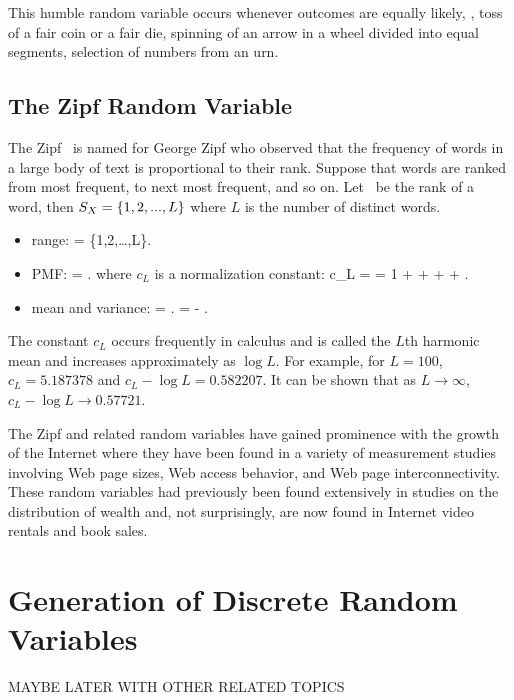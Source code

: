 	\item
	This humble random variable occurs
	whenever outcomes are equally likely, \eg,
	toss of a fair coin or a fair die,
	spinning of an arrow in a wheel divided into equal segments,
	selection of numbers from an urn.
\eit

\subsection{The Zipf Random Variable}

\bit
	\item
	The Zipf \randvar\ is named for
	George Zipf who observed that the frequency of words
	in a large body of text is proportional to their rank.
	Suppose that words are ranked from most frequent,
	to next most frequent, and so on.
	Let \X\ be the rank of a word,
	then $S_X = \{1, 2, ..., L\}$
	where $L$ is the number of distinct words.
	\begin{itemize}
		\item range:
			\ssx = \{1,2,\ldots,L\}.
		\eeql
		\item PMF:
			 =  .
		\eeql
		where $c_L$ is a normalization constant:
			c_L =  = 1 +  +  + \cdots + .
		\eeql

		\item mean and variance:
			 = .
		\eeql
			 =  - .
		\eeql
	\end{itemize}

	\item
	The constant $c_L$ occurs frequently in calculus
	and is called the $L$th harmonic mean
	and increases approximately as $\log L$.
	For example, for $L = 100$, $c_L = 5.187378$
	and $c_L - \log L = 0.582207$.
	It can be shown that as $L \to \infty$,
	$c_L - \log L \to 0.57721$.

	\item
	The Zipf and related random variables
	have gained prominence with the growth of the Internet
	where they have been found in a variety of measurement studies
	involving Web page sizes,
	Web access behavior, and Web page interconnectivity.
	These random variables had previously been found extensively
	in studies on the distribution of wealth and,
	not surprisingly, are now found in Internet video rentals and book sales.
\eit

\section{Generation of Discrete Random Variables}

MAYBE LATER WITH OTHER RELATED TOPICS


